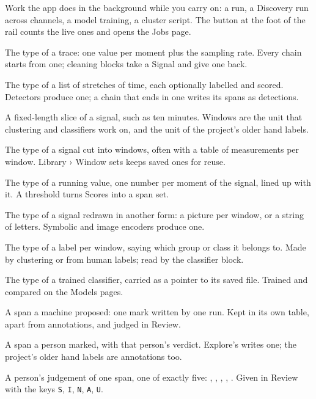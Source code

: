 \begin{glossarylist}
 Work the app does in the background while you carry on: a run, a
Discovery run across channels, a model training, a cluster script. The  button at
the foot of the rail counts the live ones and opens the Jobs page.

 The type of a trace: one value per moment plus the sampling rate.
Every chain starts from one; cleaning blocks take a Signal and give one back.

 The type of a list of stretches of time, each optionally
labelled and scored. Detectors produce one; a chain that ends in one writes its spans as
detections.

 A fixed-length slice of a signal, such as ten minutes. Windows
are the unit that clustering and classifiers work on, and the unit of the project's older
hand labels.

 The type of a signal cut into windows, often with a table
of measurements per window. Library › Window sets keeps saved ones for reuse.

 The type of a running value, one number per moment of the signal,
lined up with it. A threshold turns Scores into a span set.

 The type of a signal redrawn in another form: a picture per
window, or a string of letters. Symbolic and image encoders produce one.

 The type of a label per window, saying which group or class
it belongs to. Made by clustering or from human labels; read by the classifier block.

 The type of a trained classifier, carried as a pointer to its saved
file. Trained and compared on the Models pages.

 A span a machine proposed: one mark written by one run.
Kept in its own table, apart from annotations, and judged in Review.

 A span a person marked, with that person's verdict. Explore's
 writes one; the project's older hand labels are annotations too.

 A person's judgement of one span, one of exactly five:
, , , , . Given in
Review with the keys \texttt{S}, \texttt{I}, \texttt{N}, \texttt{A}, \texttt{U}.


\end{glossarylist}
